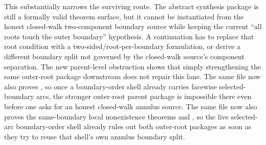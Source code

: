 \documentclass[11pt]{article}
\begin{document}
This substantially narrows the surviving route.  The abstract
 synthesis package is
still a formally valid theorem surface, but it cannot be instantiated from the
honest closed-walk two-component boundary source while keeping the current
``all roots touch the outer boundary'' hypothesis.  A continuation has to
replace that root condition with a two-sided/root-per-boundary formulation, or
derive a different boundary split not governed by the closed-walk source's
component separation.  The new parent-level obstruction shows that simply
strengthening the same outer-root package downstream does not repair this lane.
The same file now also proves
,
so once a boundary-order shell already carries facewise selected-boundary arcs,
the stronger outer-root parent package is impossible there even before one asks
for an honest closed-walk annulus source.  The same file now also proves the
same-boundary local nonexistence theorems
and
,
so the live selected-arc boundary-order shell already rules out both outer-root
packages as soon as they try to reuse that shell's own annulus boundary split.
\end{document}

